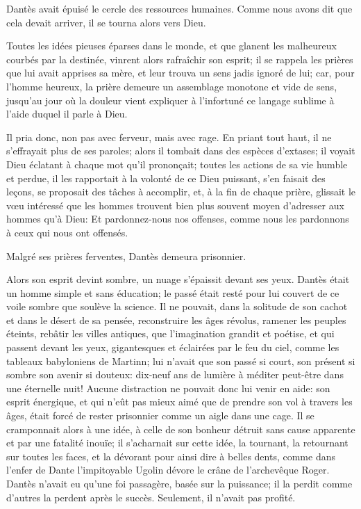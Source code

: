 Dantès avait épuisé le cercle des ressources humaines. Comme nous avons dit que cela devait arriver, il se tourna alors vers Dieu.

Toutes les idées pieuses éparses dans le monde, et que glanent les malheureux courbés par la destinée, vinrent alors rafraîchir son esprit; il se rappela les prières que lui avait apprises sa mère, et leur trouva un sens jadis ignoré de lui; car, pour l'homme heureux, la prière demeure un assemblage monotone et vide de sens, jusqu'au jour où la douleur vient expliquer à l'infortuné ce langage sublime à l'aide duquel il parle à Dieu.

Il pria donc, non pas avec ferveur, mais avec rage. En priant tout haut, il ne s'effrayait plus de ses paroles; alors il tombait dans des espèces d'extases; il voyait Dieu éclatant à chaque mot qu'il prononçait; toutes les actions de sa vie humble et perdue, il les rapportait à la volonté de ce Dieu puissant, s'en faisait des leçons, se proposait des tâches à accomplir, et, à la fin de chaque prière, glissait le vœu intéressé que les hommes trouvent bien plus souvent moyen d'adresser aux hommes qu'à Dieu: Et pardonnez-nous nos offenses, comme nous les pardonnons à ceux qui nous ont offensés.

Malgré ses prières ferventes, Dantès demeura prisonnier.

Alors son esprit devint sombre, un nuage s'épaissit devant ses yeux. Dantès était un homme simple et sans éducation; le passé était resté pour lui couvert de ce voile sombre que soulève la science. Il ne pouvait, dans la solitude de son cachot et dans le désert de sa pensée, reconstruire les âges révolus, ramener les peuples éteints, rebâtir les villes antiques, que l'imagination grandit et poétise, et qui passent devant les yeux, gigantesques et éclairées par le feu du ciel, comme les tableaux babyloniens de Martinn; lui n'avait que son passé si court, son présent si sombre son avenir si douteux: dix-neuf ans de lumière à méditer peut-être dans une éternelle nuit! Aucune distraction ne pouvait donc lui venir en aide: son esprit énergique, et qui n'eût pas mieux aimé que de prendre son vol à travers les âges, était forcé de rester prisonnier comme un aigle dans une cage. Il se cramponnait alors à une idée, à celle de son bonheur détruit sans cause apparente et par une fatalité inouïe; il s'acharnait sur cette idée, la tournant, la retournant sur toutes les faces, et la dévorant pour ainsi dire à belles dents, comme dans l'enfer de Dante l'impitoyable Ugolin dévore le crâne de l'archevêque Roger. Dantès n'avait eu qu'une foi passagère, basée sur la puissance; il la perdit comme d'autres la perdent après le succès. Seulement, il n'avait pas profité.

